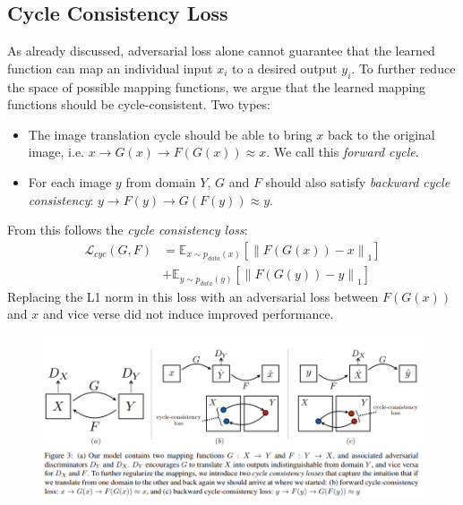 \documentclass{scrartcl}
\newcommand{\norm}[1]{\left\lVert#1\right\rVert}
\begin{document}
\subsection*{Cycle Consistency Loss}
As already discussed, adversarial loss alone cannot guarantee that the learned function can map an individual input $x_i$ to a desired output $y_i$. To further reduce the space of possible mapping functions, we argue that the learned mapping functions should be cycle-consistent. Two types:
\begin{itemize}
	\item
		The image translation cycle should be able to bring $x$ back to the original image, i.e. $x \rightarrow G(x) \rightarrow F(G(x)) \approx x.$ We call this \textit{forward cycle}.
	\item
		For each image $y$ from domain $Y$, $G$ and $F$ should also satisfy \textit{backward cycle consistency}: $y \rightarrow F(y) \rightarrow G(F(y)) \approx y$.
\end{itemize}
From this follows the \textit{cycle consistency loss}:
\begin{equation}
\begin{split}
\mathcal{L}_{cyc}(G, F) &= \mathbb{E}_{x \sim p_{data}(x)}[\norm{F(G(x)) - x}_1] \\
& + \mathbb{E}_{y \sim p_{data}(y)}[\norm{F(G(y)) - y}_1]
\end{split}
\end{equation}
Replacing the L1 norm in this loss with an adversarial loss between $F(G(x))$ and $x$ and vice verse did not induce improved performance.

\begin{figure}
	\centering
		\includegraphics[scale=0.6]{cyclegan}
	\label{fig:cyclegan}
\end{figure}
\end{document}
